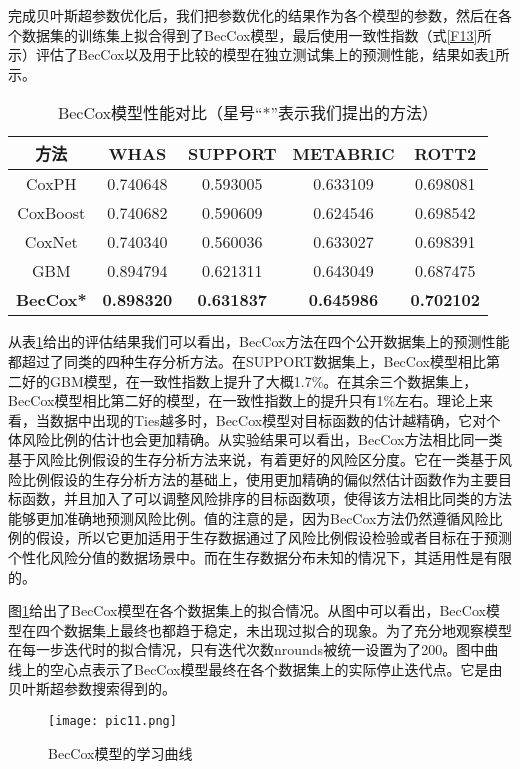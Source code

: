 完成贝叶斯超参数优化后，我们把参数优化的结果作为各个模型的参数，然后在各个数据集的训练集上拟合得到了BecCox模型，最后使用一致性指数（式\eqref{F13}所示）评估了BecCox以及用于比较的模型在独立测试集上的预测性能，结果如表\ref{table05}所示。

\begin{table}[h]
\caption{BecCox模型性能对比（星号“*”表示我们提出的方法）}
\begin{tabular}{ccccc}
\toprule
方法 & WHAS & SUPPORT & METABRIC & ROTT2 \\ 
\midrule
CoxPH & 0.740648 & 0.593005 & 0.633109 & 0.698081 \\
CoxBoost & 0.740682 & 0.590609 & 0.624546 & 0.698542 \\
CoxNet & 0.740340 & 0.560036 & 0.633027 & 0.698391 \\
GBM & 0.894794 & 0.621311 & 0.643049 & 0.687475 \\
\textbf{BecCox*} & \textbf{0.898320} & \textbf{0.631837} & \textbf{0.645986} & \textbf{0.702102} \\
\bottomrule
\end{tabular}
\label{table05}
\end{table}

从表\ref{table05}给出的评估结果我们可以看出，BecCox方法在四个公开数据集上的预测性能都超过了同类的四种生存分析方法。在SUPPORT数据集上，BecCox模型相比第二好的GBM模型，在一致性指数上提升了大概1.7\%。在其余三个数据集上，BecCox模型相比第二好的模型，在一致性指数上的提升只有1\%左右。理论上来看，当数据中出现的Ties越多时，BecCox模型对目标函数的估计越精确，它对个体风险比例的估计也会更加精确。从实验结果可以看出，BecCox方法相比同一类基于风险比例假设的生存分析方法来说，有着更好的风险区分度。它在一类基于风险比例假设的生存分析方法的基础上，使用更加精确的偏似然估计函数作为主要目标函数，并且加入了可以调整风险排序的目标函数项，使得该方法相比同类的方法能够更加准确地预测风险比例。值的注意的是，因为BecCox方法仍然遵循风险比例的假设，所以它更加适用于生存数据通过了风险比例假设检验或者目标在于预测个性化风险分值的数据场景中。而在生存数据分布未知的情况下，其适用性是有限的。

图\ref{pic11}给出了BecCox模型在各个数据集上的拟合情况。从图中可以看出，BecCox模型在四个数据集上最终也都趋于稳定，未出现过拟合的现象。为了充分地观察模型在每一步迭代时的拟合情况，只有迭代次数nrounds被统一设置为了200。图中曲线上的空心点表示了BecCox模型最终在各个数据集上的实际停止迭代点。它是由贝叶斯超参数搜索得到的。

\begin{figure}[H]
\texttt{[image: pic11.png]}
\caption{BecCox模型的学习曲线}
\label{pic11}
\end{figure}

